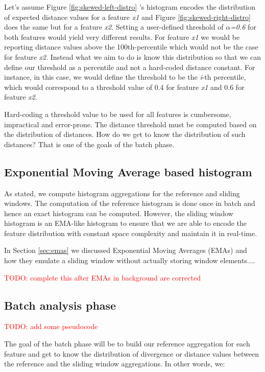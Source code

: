 Let's assume Figure \ref{fig:skewed-left-distro} 's histogram encodes the distribution of expected distance values for a feature \textit{x1} and Figure \ref{fig:skewed-right-distro} does the same but for a feature \textit{x2}. Setting a user-defined threshold of \textit{$\alpha$=0.6} for both features would yield very different results. For feature \textit{x1} we would be reporting distance values above the 100th-percentile which would not be the case for feature \textit{x2}. Instead what we aim to do is know this distribution so that we can define our threshold as a percentile and not a hard-coded distance constant. For instance, in this case, we would define the threshold to be the \textit{i}-th percentile, which would correspond to a threshold value of 0.4 for feature \textit{x1} and 0.6 for feature \textit{x2}.

Hard-coding a threshold value to be used for all features is cumbersome, impractical and error-prone. The distance threshold must be computed based on the distribution of distances. How do we get to know the distribution of such distances? That is one of the goals of the batch phase.
\fi


\subsection{Exponential Moving Average based histogram} \label{sec:ema-hist}
As stated, we compute histogram aggregations for the reference and sliding windows. The computation of the reference histogram is done once in batch and hence an exact histogram can be computed. However, the sliding window histogram is an EMA-like histogram to ensure that we are able to encode the feature distribution with constant space complexity and maintain it in real-time.

In Section \ref{sec:emas} we discussed Exponential Moving Averages (EMAs) and how they emulate a sliding window without actually storing window elements....

\textcolor{red}{TODO: complete this after EMAs in background are corrected}

\subsection{Batch analysis phase} \label{sec:batch-phase}
\textcolor{red}{TODO: add some pseudocode}

The goal of the batch phase will be to build our reference aggregation for each feature and get to know the distribution of divergence or distance values between the reference and the sliding window aggregations. In other words, we:

